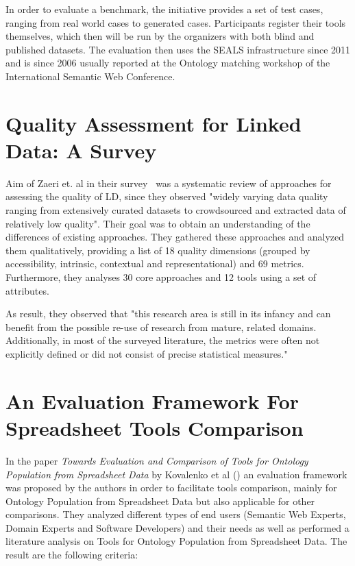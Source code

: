 In order to evaluate a benchmark, the initiative provides a set of test cases, ranging from real world cases to generated cases. Participants register their tools themselves, which then will be run by the organizers with both blind and published datasets. The evaluation then uses the SEALS infrastructure since 2011 and is since 2006 usually reported at the Ontology matching workshop of the International Semantic Web Conference.

\section{Quality Assessment for Linked Data: A Survey}

Aim of Zaeri et. al in their survey~\cite{zaveri2016quality} was a systematic review of approaches for assessing the quality of LD, since they observed "widely varying data quality ranging from extensively curated datasets to crowdsourced and extracted data of relatively low quality". Their goal was to obtain an understanding of the differences of existing approaches. They gathered these approaches and analyzed them qualitatively, providing a list of 18 quality dimensions (grouped by accessibility, intrinsic, contextual and representational) and 69 metrics. Furthermore, they analyses 30 core approaches and 12 tools using a set of attributes.

As result, they observed that "this research area is still in its infancy and can benefit from the possible re-use of research from mature, related domains. Additionally, in most of the surveyed literature, the metrics were often not explicitly defined or did not consist of precise statistical measures."

\section{An Evaluation Framework For Spreadsheet Tools Comparison}

In the paper \emph{Towards Evaluation and Comparison of Tools for Ontology Population from Spreadsheet Data} by Kovalenko et al (\cite{kovalenko2013towards}) an evaluation framework was proposed by the authors in order to facilitate tools comparison, mainly for Ontology Population from Spreadsheet Data but also applicable for other comparisons. They analyzed different types of end users (Semantic Web Experts, Domain Experts and Software Developers) and their needs as well as performed a literature analysis on Tools for Ontology Population from Spreadsheet Data. The result are the following criteria:

